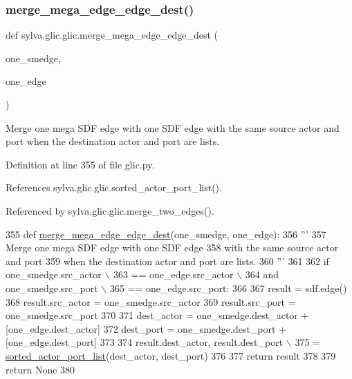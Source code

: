 \subsubsection{\texorpdfstring{merge\+\_\+mega\+\_\+edge\+\_\+edge\+\_\+dest()}{merge\_mega\_edge\_edge\_dest()}}
{\footnotesize\ttfamily def sylva.\+glic.\+glic.\+merge\+\_\+mega\+\_\+edge\+\_\+edge\+\_\+dest (\begin{DoxyParamCaption}\item[{}]{one\+\_\+smedge,  }\item[{}]{one\+\_\+edge }\end{DoxyParamCaption})}

\begin{DoxyVerb}  Merge one mega SDF edge with one SDF edge
  with the same source actor and port
  when the destination actor and port are lists.
\end{DoxyVerb}
 

Definition at line 355 of file glic.\+py.



References sylva.\+glic.\+glic.\+sorted\+\_\+actor\+\_\+port\+\_\+list().



Referenced by sylva.\+glic.\+glic.\+merge\+\_\+two\+\_\+edges().


\begin{DoxyCode}
355     \textcolor{keyword}{def }\hyperlink{namespacesylva_1_1glic_1_1glic_aaa193270639d512daa1cf9fc2f952fdb}{merge\_mega\_edge\_edge\_dest}(one\_smedge, one\_edge):
356         \textcolor{stringliteral}{'''}
357 \textcolor{stringliteral}{          Merge one mega SDF edge with one SDF edge}
358 \textcolor{stringliteral}{          with the same source actor and port}
359 \textcolor{stringliteral}{          when the destination actor and port are lists.}
360 \textcolor{stringliteral}{        '''}
361 
362         \textcolor{keywordflow}{if} one\_smedge.src\_actor \(\backslash\)
363                 == one\_edge.src\_actor \(\backslash\)
364                 \textcolor{keywordflow}{and} one\_smedge.src\_port \(\backslash\)
365                 == one\_edge.src\_port:
366 
367             result = sdf.edge()
368             result.src\_actor = one\_smedge.src\_actor
369             result.src\_port = one\_smedge.src\_port
370 
371             dest\_actor = one\_smedge.dest\_actor + [one\_edge.dest\_actor]
372             dest\_port = one\_smedge.dest\_port + [one\_edge.dest\_port]
373 
374             result.dest\_actor, result.dest\_port \(\backslash\)
375                 = \hyperlink{namespacesylva_1_1glic_1_1glic_af9c053311339f7220d8a605b492126c0}{sorted\_actor\_port\_list}(dest\_actor, dest\_port)
376 
377             \textcolor{keywordflow}{return} result
378 
379         \textcolor{keywordflow}{return} \textcolor{keywordtype}{None}
380 
\end{DoxyCode}
\mbox{\label{namespacesylva_1_1glic_1_1glic_adaac876d9630352fd0f5e4e3350d5b30}} 
